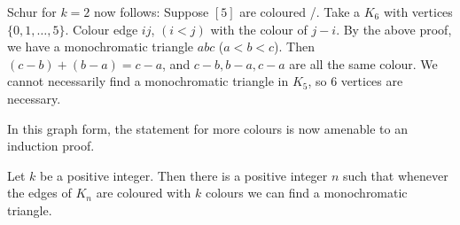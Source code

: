 \documentclass{article}
\begin{document}
\begin{remark}
    Schur for $k=2$ now follows: Suppose $[5]$ are coloured /. Take a $K_6$ with vertices $\{0, 1, \dots, 5\}$. Colour edge $ij$, $(i<j)$ with the colour of $j-i$.
    By the above proof, we have a monochromatic triangle $abc$ ($a<b<c$). Then $(c-b) + (b-a) = c-a$, and $c-b, b-a, c-a$ are all the same colour.
    We cannot necessarily find a monochromatic triangle in $K_5$, so 6 vertices are necessary.

    \begin{center}
    \end{center}

    In this graph form, the statement for more colours is now amenable to an induction proof.
\end{remark}

\begin{nprop}
    Let $k$ be a positive integer. Then there is a positive integer $n$ such that whenever the edges of $K_n$ are coloured with $k$ colours we can find a monochromatic triangle.
\end{nprop}

\end{document}
